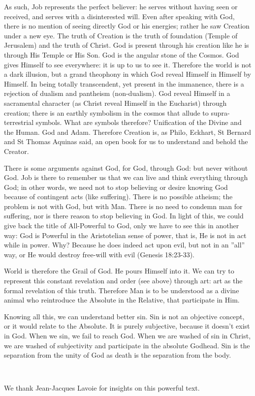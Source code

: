 As such, Job represents the perfect believer: he serves without having seen or received, and serves with a disinterested will. Even after speaking with God, there is no mention of seeing directly God or his energies; rather he saw Creation under a new eye. The truth of Creation is the truth of foundation (Temple of Jerusalem) and the truth of Christ. God is present through his creation like he is through His Temple or His Son. God is the angular stone of the Cosmos. God gives Himself to see everywhere: it is up to us to see it. Therefore the world is not a dark illusion, but a grand theophony in which God reveal Himself in Himself by Himself. In being totally transcendent, yet present in the immanence, there is a rejection of dualism and pantheism (non-dualism). God reveal Himself in a sacramental character (as Christ reveal Himself in the Eucharist) through creation; there is an earthly symbolism in the cosmos that allude to supra-terrestrial symbols. What are symbols therefore? Unification of the Divine and the Human. God and Adam. Therefore Creation is, as Philo, Eckhart, St Bernard and St Thomas Aquinas said, an open book for us to understand and behold the Creator.

There is some arguments against God, for God, through God: but never without God. Job is there to remember us that we can live and think everything through God; in other words, we need not to stop believing or desire knowing God because of contingent acts (like suffering). There is no possible atheism; the problem is not with God, but with Man. There is no need to condemn man for suffering, nor is there reason to stop believing in God. In light of this, we could give back the title of All-Powerful to God, only we have to see this in another way: God is Powerful in the Aristotelian sense of power, that is, He is not in act while in power. Why? Because he does indeed act upon evil, but not in an ”all” way, or He would destroy free-will with evil (Genesis 18:23-33).

World is therefore the Grail of God. He pours Himself into it. We can try to represent this constant revelation and order (see above) through art: art as the formal revelation of this truth. Therefore Man is to be understood as a divine animal who reintroduce the Absolute in the Relative, that participate in Him.

Knowing all this, we can understand better sin. Sin is not an objective concept, or it would relate to the Absolute. It is purely subjective, because it doesn't exist in God. When we sin, we fail to reach God. When we are washed of sin in Christ, we are washed of subjectivity and participate in the absolute Godhead. Sin is the separation from the unity of God as death is the separation from the body.

 

We thank Jean-Jacques Lavoie for insights on this powerful text.

